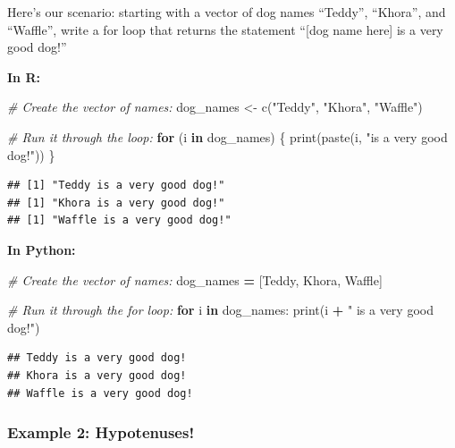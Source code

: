\documentclass[
]{book}
\newenvironment{Shaded}{\begin{snugshade}}{\end{snugshade}}
\newcommand{\BuiltInTok}[1]{#1}
\newcommand{\CommentTok}[1]{\textcolor[rgb]{0.56,0.35,0.01}{\textit{#1}}}
\newcommand{\ControlFlowTok}[1]{\textcolor[rgb]{0.13,0.29,0.53}{\textbf{#1}}}
\newcommand{\FunctionTok}[1]{\textcolor[rgb]{0.00,0.00,0.00}{#1}}
\newcommand{\KeywordTok}[1]{\textcolor[rgb]{0.13,0.29,0.53}{\textbf{#1}}}
\newcommand{\NormalTok}[1]{#1}
\newcommand{\OperatorTok}[1]{\textcolor[rgb]{0.81,0.36,0.00}{\textbf{#1}}}
\newcommand{\OtherTok}[1]{\textcolor[rgb]{0.56,0.35,0.01}{#1}}
\newcommand{\StringTok}[1]{\textcolor[rgb]{0.31,0.60,0.02}{#1}}
\begin{document}
Here's our scenario: starting with a vector of dog names ``Teddy'', ``Khora'', and ``Waffle'', write a for loop that returns the statement ``{[}dog name here{]} is a very good dog!''

\textbf{In R:}

\begin{Shaded}
\begin{Highlighting}[]
\CommentTok{\# Create the vector of names:}
\NormalTok{dog\_names }\OtherTok{\textless{}{-}} \FunctionTok{c}\NormalTok{(}\StringTok{"Teddy"}\NormalTok{, }\StringTok{"Khora"}\NormalTok{, }\StringTok{"Waffle"}\NormalTok{)}

\CommentTok{\# Run it through the loop:}
\ControlFlowTok{for}\NormalTok{ (i }\ControlFlowTok{in}\NormalTok{ dog\_names) \{}
  \FunctionTok{print}\NormalTok{(}\FunctionTok{paste}\NormalTok{(i, }\StringTok{"is a very good dog!"}\NormalTok{))}
\NormalTok{\}}
\end{Highlighting}
\end{Shaded}

\begin{verbatim}
## [1] "Teddy is a very good dog!"
## [1] "Khora is a very good dog!"
## [1] "Waffle is a very good dog!"
\end{verbatim}

\textbf{In Python:}

\begin{Shaded}
\begin{Highlighting}[]
\CommentTok{\# Create the vector of names:}
\NormalTok{dog\_names }\OperatorTok{=}\NormalTok{ [}\StringTok{\textquotesingle{}Teddy\textquotesingle{}}\NormalTok{, }\StringTok{\textquotesingle{}Khora\textquotesingle{}}\NormalTok{, }\StringTok{\textquotesingle{}Waffle\textquotesingle{}}\NormalTok{]}

\CommentTok{\# Run it through the for loop:}
\ControlFlowTok{for}\NormalTok{ i }\KeywordTok{in}\NormalTok{ dog\_names:}
    \BuiltInTok{print}\NormalTok{(i }\OperatorTok{+} \StringTok{" is a very good dog!"}\NormalTok{)}
\end{Highlighting}
\end{Shaded}

\begin{verbatim}
## Teddy is a very good dog!
## Khora is a very good dog!
## Waffle is a very good dog!
\end{verbatim}

\hypertarget{example-2-hypotenuses}{%
\subsubsection{Example 2: Hypotenuses!}\label{example-2-hypotenuses}}
\end{document}
